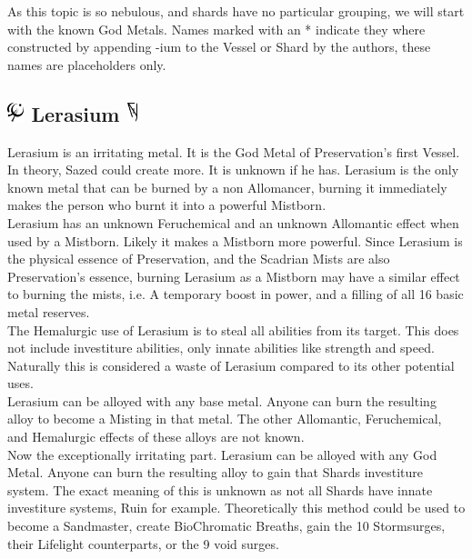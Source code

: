 \documentclass[conference]{IEEEtran}
\begin{document}
As this topic is so nebulous, and shards have no particular grouping, we will start with the known God Metals.  Names marked with an * indicate they where constructed by appending -ium to the Vessel or Shard by the authors, these names are placeholders only.  
\subsection*{\includegraphics[height=1em]{images/Lerasium.png}  Lerasium\cite{leras} \includegraphics[height=1em]{images/Lerasium_(Feruchemy).png}}
Lerasium is an irritating metal.  It is the God Metal of Preservation's first Vessel.\cite{SoS-EP}\cite{leras-leras}\cite{SoS-EP}\cite{leras}  In theory, Sazed could create more.\cite{leras-saz}  It is unknown if he has.  Lerasium is the only known metal that can be burned by a non Allomancer, burning it immediately makes the person who burnt it into a powerful Mistborn.\cite{WoA-CH59}\cite{HoA-CH3}\cite{lerasm-mist}\cite{WoB-Ler}\\

Lerasium has an unknown Feruchemical and an unknown Allomantic effect when used by a Mistborn.  Likely it makes a Mistborn more powerful.  Since Lerasium is the physical essence of Preservation, and the Scadrian Mists are also Preservation's essence,\cite{HoA-CH75} burning Lerasium as a Mistborn may have a similar effect to burning the mists, i.e. A temporary boost in power, and a filling of all 16 basic metal reserves.\cite{HoA-CH73}\\

The Hemalurgic use of Lerasium is to steal all abilities from its target.\cite{HE-TB} This does not include investiture abilities, only innate abilities like strength and speed.\cite{PvAvI}\cite{HE-le}  Naturally this is considered a waste of Lerasium compared to its other potential uses.\cite{leras-waste}\\

Lerasium can be alloyed with any base metal.\cite{shard-alloy}  Anyone can burn the resulting alloy to become a Misting in that metal.\cite{lerassting}  The other Allomantic, Feruchemical, and Hemalurgic effects of these alloys are not known.\\

Now the exceptionally irritating part.  Lerasium can be alloyed with any God Metal.  Anyone can burn the resulting alloy to gain that Shards investiture system.\cite{leras-alloy}  The exact meaning of this is unknown as not all Shards have innate investiture systems, Ruin for example.  Theoretically this method could be used to become a Sandmaster, create BioChromatic Breaths, gain the 10 Stormsurges, their Lifelight counterparts, or the 9 void surges.
\end{document}
